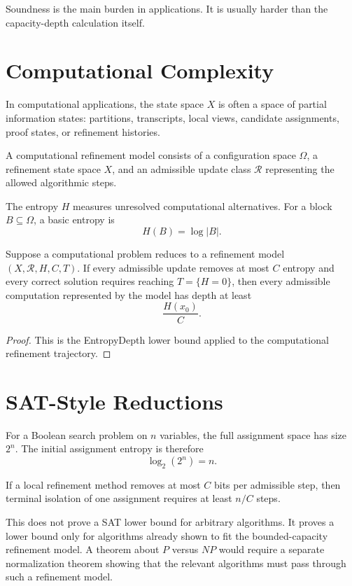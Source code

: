 Soundness is the main burden in applications. It is usually harder than the
capacity-depth calculation itself.

\section{Computational Complexity}

In computational applications, the state space \(X\) is often a space of
partial information states: partitions, transcripts, local views, candidate
assignments, proof states, or refinement histories.

\begin{definition}
A computational refinement model consists of a configuration space \(\Omega\),
a refinement state space \(X\), and an admissible update class
\(\mathcal R\) representing the allowed algorithmic steps.
\end{definition}

The entropy \(H\) measures unresolved computational alternatives. For a block
\(B\subseteq \Omega\), a basic entropy is
\[
H(B)=\log |B|.
\]

\begin{theorem}
Suppose a computational problem reduces to a refinement model
\((X,\mathcal R,H,C,T)\). If every admissible update removes at most \(C\)
entropy and every correct solution requires reaching \(T=\{H=0\}\), then every
admissible computation represented by the model has depth at least
\[
\frac{H(x_0)}{C}.
\]
\end{theorem}

\begin{proof}
This is the EntropyDepth lower bound applied to the computational refinement
trajectory.
\end{proof}

\section{SAT-Style Reductions}

For a Boolean search problem on \(n\) variables, the full assignment space has
size \(2^n\). The initial assignment entropy is therefore
\[
\log_2(2^n)=n.
\]

If a local refinement method removes at most \(C\) bits per admissible step,
then terminal isolation of one assignment requires at least \(n/C\) steps.

\begin{remark}
This does not prove a SAT lower bound for arbitrary algorithms. It proves a
lower bound only for algorithms already shown to fit the bounded-capacity
refinement model. A theorem about \(P\) versus \(NP\) would require a separate
normalization theorem showing that the relevant algorithms must pass through
such a refinement model.
\end{remark}

